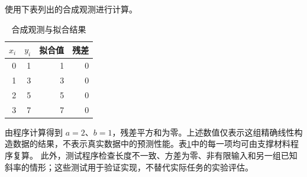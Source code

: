 使用下表列出的合成观测进行计算。
\begin{table}[htbp]\centering\caption{合成观测与拟合结果}\label{tab:data}
\begin{tabular}{rrrr}\toprule $x_i$ & $y_i$ & 拟合值 & 残差\\\midrule
0 & 1 & 1 & 0\\1 & 3 & 3 & 0\\2 & 5 & 5 & 0\\3 & 7 & 7 & 0\\
\bottomrule\end{tabular}\end{table}
由程序计算得到 $a=2$、$b=1$，残差平方和为零。上述数值仅表示这组精确线性构造数据的结果，不表示真实数据中的预测性能。表\ref{tab:data}中的每一项均可由支撑材料程序复算。
此外，测试程序检查长度不一致、方差为零、非有限输入和另一组已知斜率的情形；这些测试用于验证实现，不替代实际任务的实验评估。
